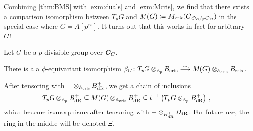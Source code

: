 \documentclass[a4paper, 10pt, oneside, DIV=9, chapterprefix=true, numbers=enddot,bibliography=totoc]{scrbook}
\begin{document}
Combining \cref{thm:BMS} with \cref{exm:duals} and \cref{exm:Mcris}, we find that there exists a comparison isomorphism between $T_pG$ and $M(G)\coloneqq M_{\mathrm{cris}}(G_{\mathcal{O}_C/p\mathcal{O}_C})$ in the special case where $G=A[p^\infty]$. It turns out that this works in fact for arbitrary $G$!
\begin{prop}\label{prop:TpGMGcomparison}
	Let $G$ be a $p$-divisible group over $\mathcal{O}_C$.
	\begin{numerate}
		\item There is a a $\phi$-equivariant isomorphism $\beta_G\colon T_pG\otimes_{\IZ_p}B_\cris\isomorphism M(G)\otimes_{\IA_\cris}B_\cris$.
		\item After tensoring with $-\otimes_{\mathbb{A}_{\mathrm{cris}}}B_{\mathrm{dR}}^+$, we get a chain of inclusions
		\begin{equation*}
			T_pG\otimes_{\mathbb{Z}_p}B_{\mathrm{dR}}^+\subseteq M(G)\otimes_{\mathbb{A}_{\mathrm{cris}}}B_{\mathrm{dR}}^+\subseteq t^{-1}\left(T_pG\otimes_{\mathbb{Z}_p}B_{\mathrm{dR}}^+\right)\,,
		\end{equation*}
		which become isomorphisms after tensoring with $-\otimes_{B_{\mathrm{dR}}^+}B_{\mathrm{dR}}$. For future use, the ring in the middle will be denoted $\Xi$.
	\end{numerate}
\end{prop}
\end{document}
